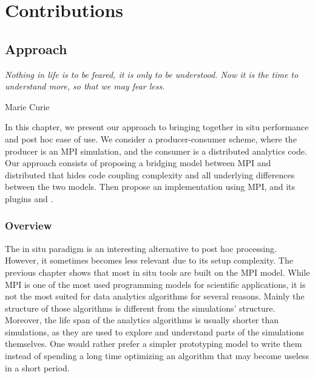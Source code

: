 \pagestyle{fancy}
\fancyhead{}
\fancyfoot{}
\fancyfoot[RO,LE]{\thepage}



\part{Contributions}\label{part:contribution}


\chapter{Approach}\label{chap:approach}
\vspace{20mm}
\epigraph{\textit{Nothing in life is to be feared, it is only to be understood. Now it is the time to understand more, so that we may fear less.}} {Marie Curie}

\vfill
In this chapter, we present our approach to bringing together in situ performance and post hoc ease of use. 
We consider a producer-consumer scheme, where the producer is an MPI simulation, and the consumer is a \dask distributed analytics code. 
Our approach consists of proposing a bridging model between MPI and \dask distributed that hides code coupling complexity and all underlying differences between the two models. 
Then propose an implementation using MPI, \pdi and its plugins and \dask. 

\newpage
\section{Overview}

The in situ paradigm is an interesting alternative to post hoc processing. However, it sometimes becomes less relevant due to its setup complexity. 
The previous chapter shows that most in situ tools are built on the MPI model. While MPI is one of the most used programming models for scientific applications, it is not the most suited for data analytics algorithms for several reasons. 
Mainly the structure of those algorithms is different from the simulations' structure. Moreover, the life span of the analytics algorithms is usually shorter than simulations, as they are used to explore and understand parts of the simulations themselves. One would rather prefer a simpler prototyping model to write them instead of spending a long time optimizing an algorithm that may become useless in a short period.

